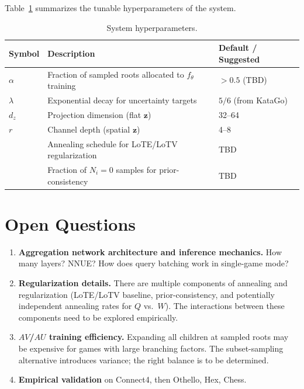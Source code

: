 \documentclass[11pt]{article}
\begin{document}
Table~\ref{tab:hyperparams} summarizes the tunable hyperparameters of the
system.

\begin{table}[h]
\centering
\begin{tabular}{@{}lll@{}}
\toprule
\textbf{Symbol} & \textbf{Description} & \textbf{Default / Suggested} \\
\midrule
$\alpha$ & Fraction of sampled roots allocated to $f_\theta$ training
         & $> 0.5$ (TBD) \\
$\lambda$ & Exponential decay for uncertainty targets
          & $5/6$ (from KataGo) \\
$d_z$    & Projection dimension (flat $\mathbf{z}$)
         & 32--64 \\
$r$      & Channel depth (spatial $\mathbf{z}$)
         & 4--8 \\
         & Annealing schedule for LoTE/LoTV regularization
         & TBD \\
         & Fraction of $N_i = 0$ samples for prior-consistency
         & TBD \\
\bottomrule
\end{tabular}
\caption{System hyperparameters.}
\label{tab:hyperparams}
\end{table}

\section{Open Questions}

\begin{enumerate}
  \item \textbf{Aggregation network architecture and inference mechanics.}
        How many layers? NNUE? How does query batching work in single-game
        mode?
  \item \textbf{Regularization details.} There are multiple components of
        annealing and regularization (LoTE/LoTV baseline, prior-consistency,
        and potentially independent annealing rates for $Q$ vs.\ $W$). The
        interactions between these components need to be explored empirically.
  \item \textbf{$AV$/$AU$ training efficiency.} Expanding all children at
        sampled roots may be expensive for games with large branching factors.
        The subset-sampling alternative introduces variance; the right balance
        is to be determined.
  \item \textbf{Empirical validation} on Connect4, then Othello, Hex, Chess.
\end{enumerate}
\end{document}
